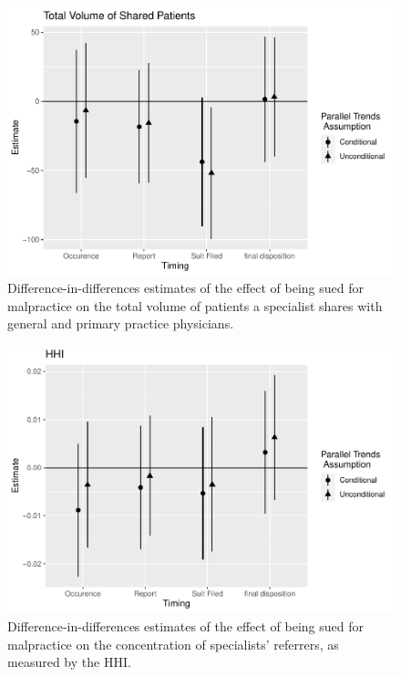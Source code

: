 \documentclass[
  12pt,
]{article}
\begin{document}
\FloatBarrier

\begin{figure}
\centering
\includegraphics{Paper_files/figure-latex/volatt-1.pdf}
\caption{\label{fig:volatt}Difference-in-differences estimates of the effect of being sued for malpractice on the total volume of patients a specialist shares with general and primary practice physicians.}
\end{figure}

\FloatBarrier

\begin{figure}
\centering
\includegraphics{Paper_files/figure-latex/hhiatt-1.pdf}
\caption{\label{fig:hhiatt}Difference-in-differences estimates of the effect of being sued for malpractice on the concentration of specialists' referrers, as measured by the HHI.}
\end{figure}
\end{document}
